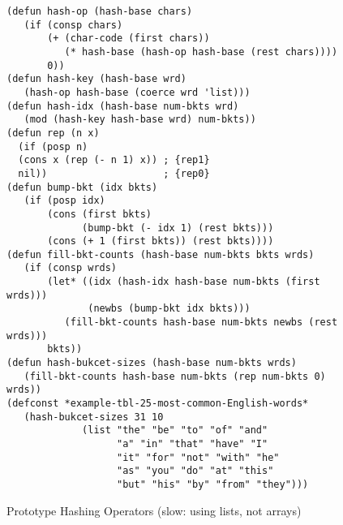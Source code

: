 \begin{figure}
\begin{center}
\begin{Verbatim}
(defun hash-op (hash-base chars)
   (if (consp chars)
       (+ (char-code (first chars))
          (* hash-base (hash-op hash-base (rest chars))))
       0))
(defun hash-key (hash-base wrd)
   (hash-op hash-base (coerce wrd 'list)))
(defun hash-idx (hash-base num-bkts wrd)
   (mod (hash-key hash-base wrd) num-bkts))
(defun rep (n x)
  (if (posp n)
  (cons x (rep (- n 1) x)) ; {rep1}
  nil))                    ; {rep0}
(defun bump-bkt (idx bkts)
   (if (posp idx)
       (cons (first bkts)
             (bump-bkt (- idx 1) (rest bkts)))
       (cons (+ 1 (first bkts)) (rest bkts))))
(defun fill-bkt-counts (hash-base num-bkts bkts wrds)
   (if (consp wrds)
       (let* ((idx (hash-idx hash-base num-bkts (first wrds)))
              (newbs (bump-bkt idx bkts)))
          (fill-bkt-counts hash-base num-bkts newbs (rest wrds)))
       bkts))
(defun hash-bukcet-sizes (hash-base num-bkts wrds)
   (fill-bkt-counts hash-base num-bkts (rep num-bkts 0) wrds))
(defconst *example-tbl-25-most-common-English-words*
   (hash-bukcet-sizes 31 10
             (list "the" "be" "to" "of" "and"
                   "a" "in" "that" "have" "I"
                   "it" "for" "not" "with" "he"
                   "as" "you" "do" "at" "this"
                   "but" "his" "by" "from" "they")))
\end{Verbatim}
\caption{Prototype Hashing Operators (slow: using lists, not arrays)}
\label{fig:hash-defuns}
\end{center}
\end{figure}

